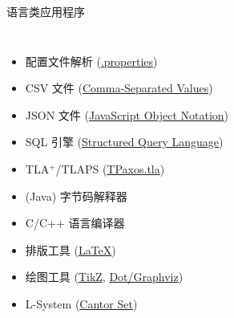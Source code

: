 \begin{frame}{}
  \begin{center}
    {\Large 语言类应用程序}
  \end{center}

  \begin{columns}
      \begin{itemize}
        \setlength{\itemsep}{6pt}
        \item 配置文件解析 (\href{https://en.wikipedia.org/wiki/.properties}{.properties})
        \item CSV 文件 (\href{https://en.wikipedia.org/wiki/Comma-separated_values\#/media/File:CsvDelimited001.svg}{Comma-Separated Values})
        \item JSON 文件 (\href{https://en.wikipedia.org/wiki/JSON\#Syntax}{JavaScript Object Notation})
        \vspace{8pt}
        \pause
        \item SQL 引擎 (\href{https://en.wikipedia.org/wiki/SQL_syntax}{Structured Query Language})
        \item TLA$^{+}$/TLAPS (\href{https://github.com/Starydark/PaxosStore-tla/blob/master/theorem\%20proving/TPaxos.tla}{TPaxos.tla})
        \item (Java) 字节码解释器
        \item C/C++ 语言编译器
        \vspace{8pt}
        \pause
        \item 排版工具 (\href{https://github.com/courses-at-nju-by-hfwei/compilers-lectures/blob/master/2021/0-overview/parts/overview.tex}{\LaTeX})
        \item 绘图工具 (\href{https://www.overleaf.com/learn/latex/TikZ_package}{TikZ},
          \href{https://renenyffenegger.ch/notes/tools/Graphviz/examples/index}{Dot/Graphviz})
        \item L-System (\href{https://en.wikipedia.org/wiki/L-system\#Example_3:_Cantor_set}{Cantor Set})
      \end{itemize}
  \end{columns}
\end{frame}

\begin{frame}{}
\end{frame}

\begin{frame}{}
  \begin{center}
  \end{center}
\end{frame}

